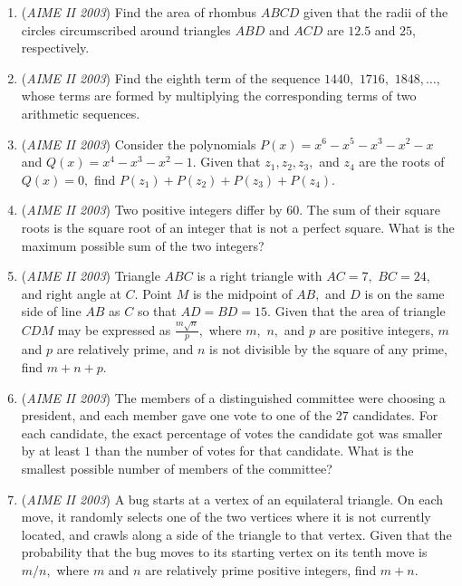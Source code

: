 \begin{enumerate}
	\item (\textit{AIME II 2003}) Find the area of rhombus $ABCD$ given that the radii of the circles circumscribed around triangles $ABD$ and $ACD$ are $12.5$ and $25$, respectively.


 

	\item (\textit{AIME II 2003}) Find the eighth term of the sequence $1440,$ $1716,$ $1848,\ldots,$ whose terms are formed by multiplying the corresponding terms of two arithmetic sequences.


 

	\item (\textit{AIME II 2003}) Consider the polynomials $P(x) = x^{6} - x^{5} - x^{3} - x^{2} - x$ and $Q(x) = x^{4} - x^{3} - x^{2} - 1.$ Given that $z_{1},z_{2},z_{3},$ and $z_{4}$ are the roots of $Q(x) = 0,$ find $P(z_{1}) + P(z_{2}) + P(z_{3}) + P(z_{4}).$


	\item (\textit{AIME II 2003}) Two positive integers differ by $60.$ The sum of their square roots is the square root of an integer that is not a perfect square. What is the maximum possible sum of the two integers?


 

	\item (\textit{AIME II 2003}) Triangle $ABC$ is a right triangle with $AC = 7,$ $BC = 24,$ and right angle at $C.$ Point $M$ is the midpoint of $AB,$ and $D$ is on the same side of line $AB$ as $C$ so that $AD = BD = 15.$ Given that the area of triangle $CDM$ may be expressed as $\frac {m\sqrt {n}}{p},$ where $m,$ $n,$ and $p$ are positive integers, $m$ and $p$ are relatively prime, and $n$ is not divisible by the square of any prime, find $m + n + p.$


	\item (\textit{AIME II 2003}) The members of a distinguished committee were choosing a president, and each member gave one vote to one of the $27$ candidates. For each candidate, the exact percentage of votes the candidate got was smaller by at least $1$ than the number of votes for that candidate. What is the smallest possible number of members of the committee?


 

	\item (\textit{AIME II 2003}) A bug starts at a vertex of an equilateral triangle. On each move, it randomly selects one of the two vertices where it is not currently located, and crawls along a side of the triangle to that vertex. Given that the probability that the bug moves to its starting vertex on its tenth move is $m/n,$ where $m$ and $n$ are relatively prime positive integers, find $m + n.$



\end{enumerate}
